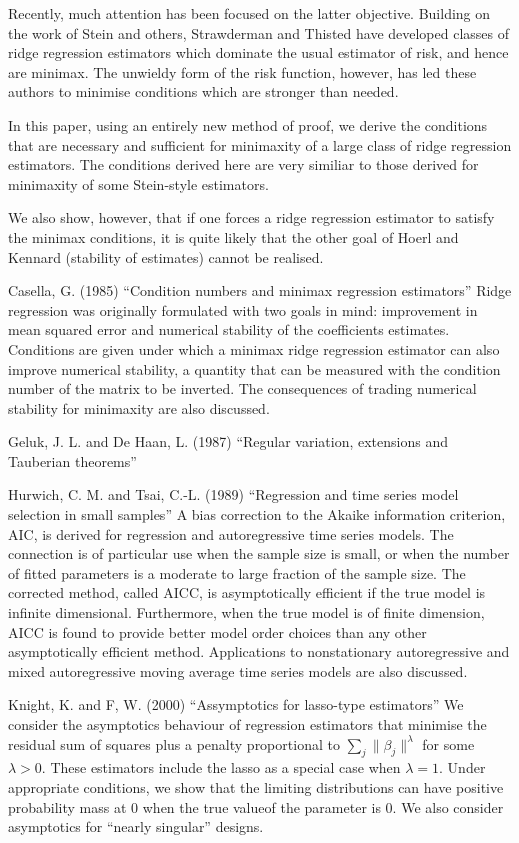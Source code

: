 \documentclass{amsart}[12pt]
\begin{document}
Recently, much attention has been focused on the latter objective. Building on the work of Stein and others,
Strawderman and Thisted have developed classes of ridge regression estimators which dominate the usual estimator
of risk, and hence are minimax. The unwieldy form of the risk function, however, has led these authors to
minimise conditions which are stronger than needed.

In this paper, using an entirely new method of proof, we derive the conditions that are necessary and sufficient
for minimaxity of a large class of ridge regression estimators. The conditions derived here are very similiar
to those derived for minimaxity of some Stein-style estimators.

We also show, however, that if one forces a ridge regression estimator to satisfy the minimax conditions, it is
quite likely that the other goal of Hoerl and Kennard (stability of estimates) cannot be realised.

Casella, G. (1985) ``Condition numbers and minimax regression estimators''
Ridge regression was originally formulated with two goals in mind: improvement in mean squared error and numerical
stability of the coefficients estimates. Conditions are given under which a minimax ridge regression estimator
can also improve numerical stability, a quantity that can be measured with the condition number of the matrix
to be inverted. The consequences of trading numerical stability for minimaxity are also discussed.

Geluk, J. L. and De Haan, L. (1987) ``Regular variation, extensions and Tauberian theorems''

Hurwich, C. M. and Tsai, C.-L. (1989) ``Regression and time series model selection in small samples''
A bias correction to the Akaike information criterion, AIC, is derived for regression and autoregressive time
series models. The connection is of particular use when the sample size is small, or when the number of fitted
parameters is a moderate to large fraction of the sample size. The corrected method, called AICC, is 
asymptotically efficient if the true model is infinite dimensional. Furthermore, when the true model is of
finite dimension, AICC is found to provide better model order choices than any other asymptotically efficient
method. Applications to nonstationary autoregressive and mixed autoregressive moving average time series models
are also discussed.

Knight, K. and F, W. (2000) ``Assymptotics for lasso-type estimators''
We consider the asymptotics behaviour of regression estimators that minimise the residual sum of squares plus
a penalty proportional to $\sum_j \|\beta_j\|^\lambda$ for some $\lambda > 0$. These estimators include
the lasso as a special case when $\lambda = 1$. Under appropriate conditions, we show that the limiting 
distributions can have positive probability mass at $0$ when the true valueof the parameter is $0$. We also 
consider asymptotics for ``nearly singular'' designs.
\end{document}
